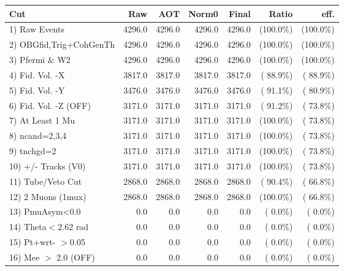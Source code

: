  \begin{table}[h!]\centering
 \begin{tabular}{||l||r|r|r|r|r|r||}
 \hline
 \hline
 Cut & Raw & AOT & Norm0 & Final & Ratio & eff.       \\
 \hline
  1) Raw Events           &       4296.0 &       4296.0 &       4296.0 &       4296.0 & (100.0\%) & (100.0\%) \\
  2) OBGfid,Trig+CohGenTh &       4296.0 &       4296.0 &       4296.0 &       4296.0 & (100.0\%) & (100.0\%) \\
  3) Pfermi \& W2         &       4296.0 &       4296.0 &       4296.0 &       4296.0 & (100.0\%) & (100.0\%) \\
  4) Fid. Vol. -X         &       3817.0 &       3817.0 &       3817.0 &       3817.0 & ( 88.9\%) & ( 88.9\%) \\
  5) Fid. Vol. -Y         &       3476.0 &       3476.0 &       3476.0 &       3476.0 & ( 91.1\%) & ( 80.9\%) \\
  6) Fid. Vol. -Z (OFF)   &       3171.0 &       3171.0 &       3171.0 &       3171.0 & ( 91.2\%) & ( 73.8\%) \\
  7) At Least 1 Mu        &       3171.0 &       3171.0 &       3171.0 &       3171.0 & (100.0\%) & ( 73.8\%) \\
  8) ncand=2,3,4          &       3171.0 &       3171.0 &       3171.0 &       3171.0 & (100.0\%) & ( 73.8\%) \\
  9) tnchgd=2             &       3171.0 &       3171.0 &       3171.0 &       3171.0 & (100.0\%) & ( 73.8\%) \\
 10) +/- Tracks (V0)      &       3171.0 &       3171.0 &       3171.0 &       3171.0 & (100.0\%) & ( 73.8\%) \\
 11) Tube/Veto Cut        &       2868.0 &       2868.0 &       2868.0 &       2868.0 & ( 90.4\%) & ( 66.8\%) \\
 12) 2 Muons (1mux)       &       2868.0 &       2868.0 &       2868.0 &       2868.0 & (100.0\%) & ( 66.8\%) \\
 13) PmuAsym<0.0          &          0.0 &          0.0 &          0.0 &          0.0 & (  0.0\%) & (  0.0\%) \\
 14) Theta$<$2.62 rad     &          0.0 &          0.0 &          0.0 &          0.0 & (  0.0\%) & (  0.0\%) \\
 15) Pt+wrt- $>$0.05      &          0.0 &          0.0 &          0.0 &          0.0 & (  0.0\%) & (  0.0\%) \\
 16) Mee $>$ 2.0  (OFF)   &          0.0 &          0.0 &          0.0 &          0.0 & (  0.0\%) & (  0.0\%) \\

\end{tabular}
\end{table}
